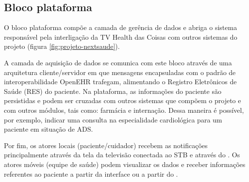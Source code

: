 \subsection{Bloco plataforma \nextsaude}

O bloco plataforma \nextsaude[] compõe a camada de gerência de dados e abriga
o sistema responsável pela interligação da TV Health das Coisas com outros sistemas
do projeto \nextsaude[] (figura \ref{fig:projeto-nextsaude}).


A camada de aquisição de dados se comunica com este bloco através de uma
arquitetura cliente/servidor em que mensagens encapsuladas com o padrão
de interoperabilidade OpenEHR trafegam, alimentando o Registro Eletrônicos
de Saúde (RES) do paciente. Na plataforma, as informações do paciente são
persistidas e podem ser cruzadas com outros sistemas que compõem o projeto
\nextsaude[] e com outros módulos, tais como: farmácia e internação.
Dessa maneira é possível, por exemplo, indicar uma consulta na especialidade
cardiológica para um paciente em situação de ADS.



Por fim, os atores locais (paciente/cuidador) recebem as notificações
principalmente através da tela da televisão conectada ao STB e através do
\smartphone. Os atores móveis (equipe de saúde) podem visualizar os dados e
receber informações referentes ao paciente a partir da interface \web[] ou a
partir do \smartphone.




